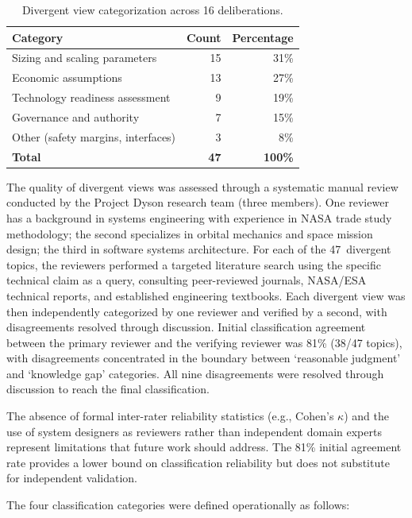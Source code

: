 \documentclass[11pt,a4paper]{article}
\begin{document}
\begin{table}[ht]
\centering
\caption{Divergent view categorization across 16 deliberations.}
\label{tab:divergent}
\begin{tabular}{@{}lrr@{}}
\toprule
\textbf{Category} & \textbf{Count} & \textbf{Percentage} \\
\midrule
Sizing and scaling parameters & 15 & 31\% \\
Economic assumptions & 13 & 27\% \\
Technology readiness assessment & 9 & 19\% \\
Governance and authority & 7 & 15\% \\
Other (safety margins, interfaces) & 3 & 8\% \\
\midrule
\textbf{Total} & \textbf{47} & \textbf{100\%} \\
\bottomrule
\end{tabular}
\end{table}

The quality of divergent views was assessed through a systematic manual review conducted by the Project Dyson research team (three members). One reviewer has a background in systems engineering with experience in NASA trade study methodology; the second specializes in orbital mechanics and space mission design; the third in software systems architecture. For each of the 47~divergent topics, the reviewers performed a targeted literature search using the specific technical claim as a query, consulting peer-reviewed journals, NASA/ESA technical reports, and established engineering textbooks. Each divergent view was then independently categorized by one reviewer and verified by a second, with disagreements resolved through discussion. Initial classification agreement between the primary reviewer and the verifying reviewer was 81\% (38/47 topics), with disagreements concentrated in the boundary between `reasonable judgment' and `knowledge gap' categories. All nine disagreements were resolved through discussion to reach the final classification.

The absence of formal inter-rater reliability statistics (e.g., Cohen's $\kappa$) and the use of system designers as reviewers rather than independent domain experts represent limitations that future work should address. The 81\% initial agreement rate provides a lower bound on classification reliability but does not substitute for independent validation.

The four classification categories were defined operationally as follows:
\end{document}

